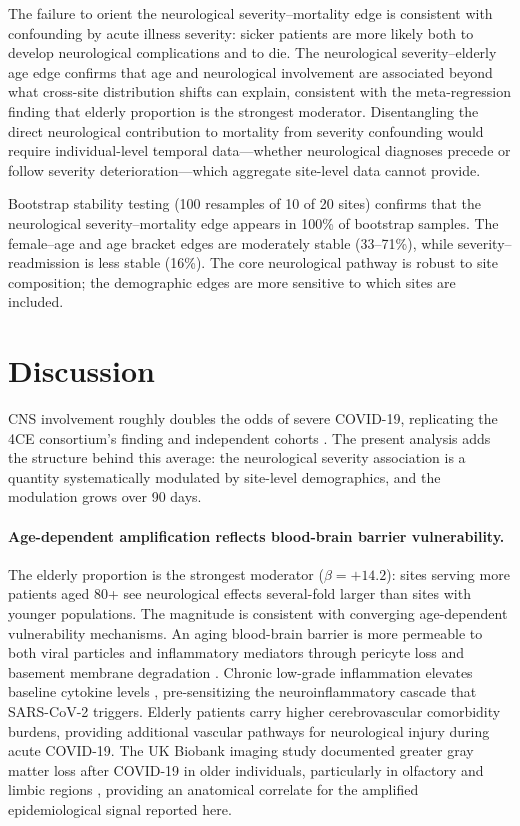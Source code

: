 \documentclass{article}
\begin{document}
The failure to orient the neurological severity--mortality edge is consistent with confounding by acute illness severity: sicker patients are more likely both to develop neurological complications and to die.
The neurological severity--elderly age edge confirms that age and neurological involvement are associated beyond what cross-site distribution shifts can explain, consistent with the meta-regression finding that elderly proportion is the strongest moderator.
Disentangling the direct neurological contribution to mortality from severity confounding would require individual-level temporal data---whether neurological diagnoses precede or follow severity deterioration---which aggregate site-level data cannot provide.

Bootstrap stability testing (100 resamples of 10 of 20 sites) confirms that the neurological severity--mortality edge appears in 100\% of bootstrap samples.
The female--age and age bracket edges are moderately stable (33--71\%), while severity--readmission is less stable (16\%).
The core neurological pathway is robust to site composition; the demographic edges are more sensitive to which sites are included.


\section{Discussion}

CNS involvement roughly doubles the odds of severe COVID-19, replicating the 4CE consortium's finding \cite{four_ce_neuro2021} and independent cohorts \cite{frontera2021neuro, mao2020neuro}.
The present analysis adds the structure behind this average: the neurological severity association is a quantity systematically modulated by site-level demographics, and the modulation grows over 90 days.

\paragraph{Age-dependent amplification reflects blood-brain barrier vulnerability.}
The elderly proportion is the strongest moderator ($\beta = +14.2$): sites serving more patients aged 80+ see neurological effects several-fold larger than sites with younger populations.
The magnitude is consistent with converging age-dependent vulnerability mechanisms.
An aging blood-brain barrier is more permeable to both viral particles and inflammatory mediators through pericyte loss and basement membrane degradation \cite{montagne2015bbb}.
Chronic low-grade inflammation elevates baseline cytokine levels \cite{franceschi2018inflammaging}, pre-sensitizing the neuroinflammatory cascade that SARS-CoV-2 triggers.
Elderly patients carry higher cerebrovascular comorbidity burdens, providing additional vascular pathways for neurological injury during acute COVID-19.
The UK Biobank imaging study documented greater gray matter loss after COVID-19 in older individuals, particularly in olfactory and limbic regions \cite{douaud2022brain}, providing an anatomical correlate for the amplified epidemiological signal reported here.
\end{document}
